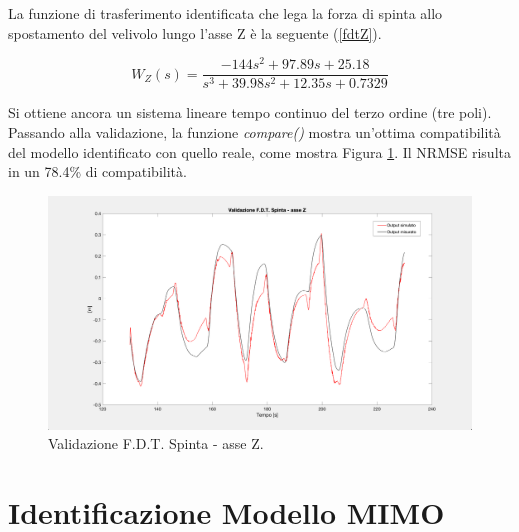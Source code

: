 La funzione di trasferimento identificata che lega la forza di spinta allo spostamento del velivolo lungo l'asse Z è la seguente (\ref{fdtZ}).

\begin{equation}
	W_Z(s) = \frac{-144s^2 + 97.89s + 25.18}{s^3 + 39.98s^2 + 12.35s + 0.7329}
	\label{fdtZ}
\end{equation}

Si ottiene ancora un sistema lineare tempo continuo del terzo ordine (tre poli).\\

Passando alla validazione, la funzione \emph{compare()} \cite{compare} mostra un'ottima compatibilità del modello identificato con quello reale, come mostra Figura \ref{fig:tz_model}. Il \acs{NRMSE} risulta in un 78.4\% di compatibilità.

\begin{figure}[H]
	\centering
	\includegraphics[width=1\textwidth]{gfx/SysId/tz_model}
	\caption[Validazione F.D.T. Spinta - asse Z.]{Validazione F.D.T. Spinta - asse Z.}
	\label{fig:tz_model}
\end{figure}


\section{Identificazione Modello MIMO}

